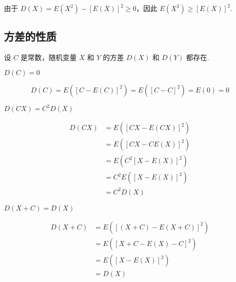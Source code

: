 \vspace{-1em}

\begin{conclusion}
    由于 $D(X) = E(X^2) - [E(X)]^2 \geqslant 0$，因此 $E(X^2) \geqslant [E(X)]^2$.
\end{conclusion}

\subsection{方差的性质}

设 $C$ 是常数，随机变量 $X$ 和 $Y$ 的方差 $D(X)$ 和 $D(Y)$ 都存在.

\setcounter{propertyname}{0}

\begin{property}
    $D(C) = 0$
\end{property}

\vspace{-1em}

\begin{myproof}
    $$
    D(C) = E([C-E(C)]^2) = E([C-C]^2) = E(0) = 0
    $$
\end{myproof}

\begin{property}
    $D(CX) = C^2 D(X)$
\end{property}

\vspace{-1em}

\begin{myproof}
    $$
    \begin{aligned}
        D(CX) &= E([CX - E(CX)]^2) \\
        &= E([CX - CE(X)]^2) \\
        &= E(C^2 [X-E(X)]^2) \\
        &= C^2 E([X-E(X)]^2) \\
        &= C^2 D(X)
    \end{aligned}
    $$
\end{myproof}

\begin{property}
    $D(X+C) = D(X)$
\end{property}

\vspace{-1em}

\begin{myproof}
    $$
    \begin{aligned}
        D(X+C) &= E([(X+C) - E(X+C)]^2) \\
        &= E([X + C - E(X) - C]^2) \\
        &= E([X-E(X)]^2) \\
        &= D(X)
    \end{aligned}
    $$
\end{myproof}

